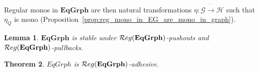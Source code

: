 \documentclass[a4paper, twoside,openright]{report}
\theoremstyle{plain}
\newtheorem{theorem}{Theorem}[section]
\newtheorem{lemma}[theorem]{Lemma}
\theoremstyle{definition}
\begin{document}
Regular monos in $\mathbf{EqGrph}$ are then natural transformations $\eta: \mathcal{G \dot\rightarrow H}$ such that $\eta_Q$ is mono (Proposition~\ref{prop:reg_mono_in_EG_are_mono_in_graph}).

\begin{lemma}
    $\mathbf{EqGrph}$ is stable under $\mathcal{R}eg(\mathbf{EqGrph})$-pushouts and $\mathcal{R}eg({\mathbf{EqGrph}})$-pullbacks.
\end{lemma}

\begin{theorem}
    $EqGrph$ is $\mathcal{R}eg(\mathbf{EqGrph})$-adhesive.
\end{theorem}





\end{document}
